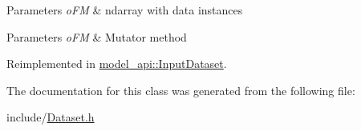 \begin{DoxyParams}{Parameters}
{\em o\+FM} & ndarray with data instances \\
\hline
\end{DoxyParams}

\begin{DoxyParams}{Parameters}
{\em o\+FM} & Mutator method \\
\hline
\end{DoxyParams}


Reimplemented in \hyperlink{classmodel__api_1_1InputDataset_a71111535a17422db1f0fdbe2ac6ce1c8}{model\+\_\+api\+::\+Input\+Dataset}.



The documentation for this class was generated from the following file\+:\begin{DoxyCompactItemize}
\item 
include/\hyperlink{Dataset_8h}{Dataset.\+h}\end{DoxyCompactItemize}
